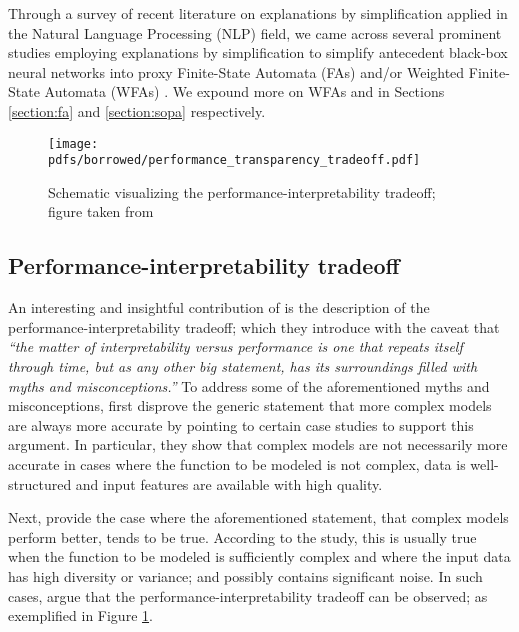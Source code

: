 Through a survey of recent literature on explanations by simplification applied
in the Natural Language Processing (NLP) field, we came across several prominent
studies employing explanations by simplification to simplify antecedent
black-box neural networks into proxy Finite-State Automata (FAs) and/or Weighted
Finite-State Automata (WFAs)
\citep{schwartz2018sopa,peng2018rational,suresh-etal-2019-distilling,wang2019state,jiang2020cold}.
We expound more on WFAs and \citet{schwartz2018sopa} in Sections
\ref{section:fa} and \ref{section:sopa} respectively.

\begin{figure}[t]
  \centering
  \texttt{[image: pdfs/borrowed/performance\_transparency\_tradeoff.pdf]}
  \caption{Schematic visualizing the performance-interpretability tradeoff;
    figure taken from \citet{arrieta2020explainable}}
  \label{fig:performance_interpretability_tradeoff}
\end{figure}

\subsection{Performance-interpretability tradeoff}

An interesting and insightful contribution of \citet[Page 18, Section
5.1]{arrieta2020explainable} is the description of the
performance-interpretability tradeoff; which they introduce with the caveat that
\textit{``the matter of interpretability versus performance is one that repeats
  itself through time, but as any other big statement, has its surroundings
  filled with myths and misconceptions.''} To address some of the aforementioned
myths and misconceptions, \citet{arrieta2020explainable} first disprove the
generic statement that more complex models are always more accurate by pointing
to certain case studies to support this argument. In particular, they show that
complex models are not necessarily more accurate in cases where the function to
be modeled is not complex, data is well-structured and input features are
available with high quality.

Next, \citet{arrieta2020explainable} provide the case where the aforementioned
statement, that complex models perform better, tends to be true. According to
the study, this is usually true when the function to be modeled is sufficiently
complex and where the input data has high diversity or variance; and possibly
contains significant noise. In such cases, \citet{arrieta2020explainable} argue
that the performance-interpretability tradeoff can be observed; as exemplified
in Figure \ref{fig:performance_interpretability_tradeoff}.
 
